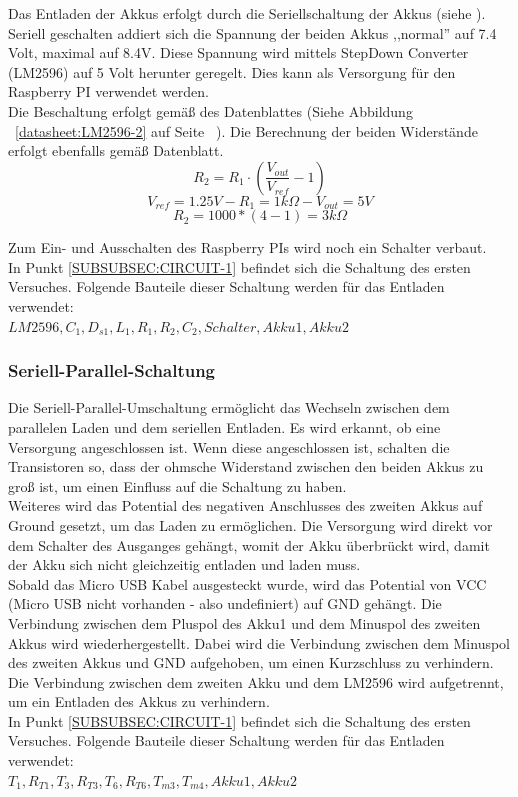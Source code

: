 \documentclass[12pt,a4paper]{article}
\begin{document}
{Das Entladen der Akkus erfolgt durch die Seriellschaltung der Akkus (siehe ). Seriell geschalten addiert sich die Spannung der beiden Akkus ,,normal'' auf 7.4 Volt, maximal auf 8.4V. Diese Spannung wird mittels StepDown Converter (LM2596) auf 5 Volt herunter geregelt.  Dies kann als Versorgung für den Raspberry PI verwendet werden. \\
Die Beschaltung erfolgt gemäß des Datenblattes (Siehe Abbildung ~\ref{datasheet:LM2596-2} auf Seite ~\pageref{datasheet:LM2596-2}). Die Berechnung der beiden Widerstände erfolgt ebenfalls gemäß Datenblatt.
\[R_2 = R_1 \cdot \left(\frac{V_{out}}{V_{ref}} - 1 \right)\]
\[V_{ref} = 1.25 V - R_1 = 1 k\Omega - V_{out} = 5V\]
\[R_2 = 1000*(4-1) = 3 k\Omega\]

Zum Ein- und Ausschalten des Raspberry PIs wird noch ein Schalter verbaut. \\
In Punkt \ref{SUBSUBSEC:CIRCUIT-1} befindet sich die Schaltung des ersten Versuches. Folgende Bauteile dieser Schaltung werden für das Entladen verwendet:\\ $LM2596,C_1,D_{s1},L_1,R_1,R_2,C_2,Schalter,Akku1, Akku2$ \\

\subsubsection{Seriell-Parallel-Schaltung}
\label{SUBSUBSEC:SERPAR}

Die Seriell-Parallel-Umschaltung ermöglicht das Wechseln zwischen dem parallelen Laden und dem seriellen Entladen. Es wird erkannt, ob eine Versorgung angeschlossen ist. Wenn diese angeschlossen ist, schalten die Transistoren so, dass der ohmsche Widerstand zwischen den beiden Akkus zu groß ist, um einen Einfluss auf die Schaltung zu haben.\\
Weiteres wird das Potential des negativen Anschlusses des zweiten Akkus auf Ground gesetzt, um das Laden zu ermöglichen. Die Versorgung wird direkt vor dem Schalter des Ausganges gehängt, womit der Akku überbrückt wird, damit der Akku sich nicht gleichzeitig entladen und laden muss. \\[2ex] 
Sobald das Micro USB Kabel ausgesteckt wurde, wird das Potential von VCC (Micro USB nicht vorhanden - also undefiniert) auf GND gehängt. Die Verbindung zwischen dem Pluspol des Akku1 und dem Minuspol des zweiten Akkus wird wiederhergestellt. Dabei wird die Verbindung zwischen dem Minuspol des zweiten Akkus und GND aufgehoben, um einen Kurzschluss zu verhindern.  \\
Die Verbindung zwischen dem zweiten Akku und dem LM2596 wird aufgetrennt, um ein Entladen des Akkus zu verhindern. \\
In Punkt \ref{SUBSUBSEC:CIRCUIT-1} befindet sich die Schaltung des ersten Versuches. Folgende Bauteile dieser Schaltung werden für das Entladen verwendet:\\ $T_1,R_{T1},T_3,R_{T3},T_6,R_{T6},T_{m3},T_{m4}, Akku1, Akku2$ \\

}
\end{document}
